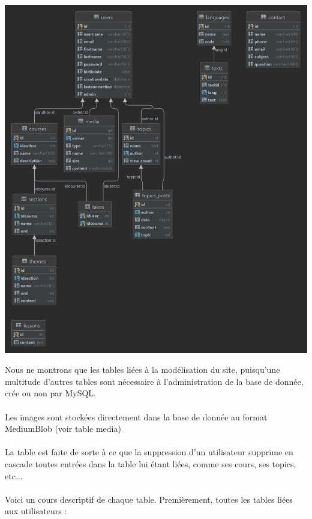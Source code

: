 \documentclass[a4paper,10pt]{article}
\begin{document}
\centerline{
    \includegraphics[width=16cm]{images/DB.png}
}
Nous ne montrons que les tables liées à la modélisation du site, puisqu'une multitude d'autres tables sont nécessaire à l'administration de la base de donnée, crée ou non par MySQL.\\\\
Les images sont stockées directement dans la base de donnée au format MediumBlob (voir table media)\\\\
La table est faite de sorte à ce que la suppression d'un utilisateur supprime en cascade toutes entrées dans la table lui étant liées, comme ses cours, ses topics, etc...\\\\
Voici un cours descriptif de chaque table. Premièrement, toutes les tables liées aux utilisateurs :
\end{document}
